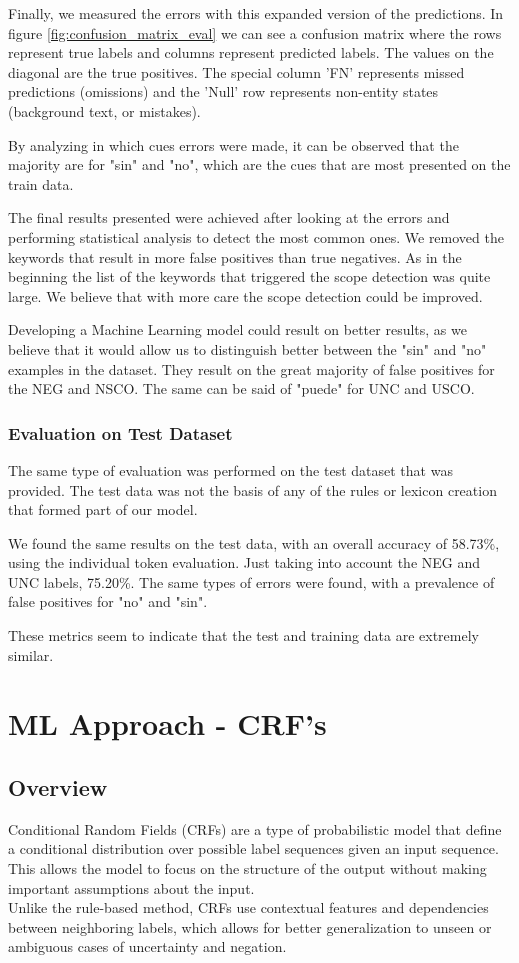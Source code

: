 \documentclass[9pt,a4paper,twoside]{tau-class/tau}
\begin{document}
        Finally, we measured the errors with this expanded version of the predictions. In figure \ref{fig:confusion_matrix_eval} we can see a confusion matrix where the rows represent true labels and columns represent predicted labels. The values on the diagonal are the true positives. The special column 'FN' represents missed predictions (omissions) and the 'Null' row represents non-entity states (background text, or mistakes).

        By analyzing in which cues errors were made, it can be observed that the majority are for "sin" and "no", which are the cues that are most presented on the train data.
        
        The final results presented were achieved after looking at the errors and performing statistical analysis to detect the most common ones. We removed the keywords that result in more false positives than true negatives. As in the beginning the list of the keywords that triggered the scope detection was quite large. We believe that with more care the scope detection could be improved.

        Developing a Machine Learning model could result on better results, as we believe that it would allow us to distinguish better between the "sin" and "no" examples in the dataset. They result on the great majority of false positives for the NEG and NSCO. The same can be said of "puede" for UNC and USCO.

        \subsubsection{Evaluation on Test Dataset}
        The same type of evaluation was performed on the test dataset that was provided. The test data was not the basis of any of the rules or lexicon creation that formed part of our model.

        We found the same results on the test data, with an overall accuracy of 58.73\%, using the individual token evaluation. Just taking into account the NEG and UNC labels, 75.20\%. The same types of errors were found, with a prevalence of false positives for "no" and "sin".

        These metrics seem to indicate that the test and training data are extremely similar.

\section{ML Approach - CRF's} \label{sec:ML-based}
      \subsection{Overview}
        Conditional Random Fields (CRFs) are a type of probabilistic model that define a conditional distribution over possible label sequences given an input sequence. This allows the model to focus on the structure of the output without making important assumptions about the input.
        \\
        Unlike the rule-based method, CRFs use contextual features and dependencies between neighboring labels, which allows for better generalization to unseen or ambiguous cases of uncertainty and negation.
        
\end{document}
